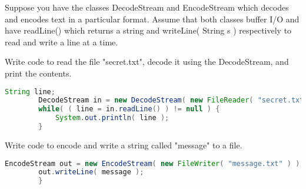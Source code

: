 Suppose you have the classes DecodeStream and EncodeStream which decodes and encodes text in a particular format.
Assume that both classes buffer I/O and have readLine() which returns a string and writeLine( String s ) respectively to read and write a line at a time.

Write code to read the file "secret.txt", decode it using the DecodeStream, and print the contents.
\begin{answer}
	\begin{lstlisting}[language=java]
		String line;
		DecodeStream in = new DecodeStream( new FileReader( "secret.txt" ) );
		while( ( line = in.readLine() ) != null ) {
			System.out.println( line );
		}
	\end{lstlisting}
\end{answer}
Write code to encode and write a string called "message" to a file.
\begin{answer}
	\begin{lstlisting}[language=java]
		EncodeStream out = new EncodeStream( new FileWriter( "message.txt" ) );
		out.writeLine( message );
		}
	\end{lstlisting}
\end{answer}

\vspace{24pt}
